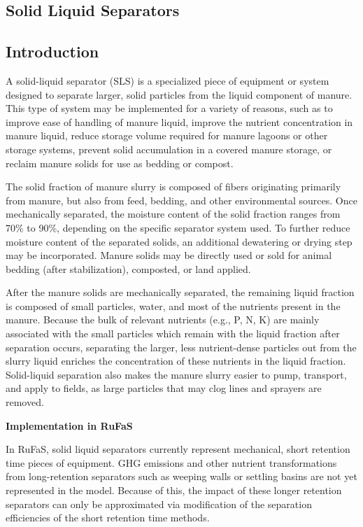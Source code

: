 \begin{refsection}
 


\section{Solid Liquid Separators} 
\subsection{Introduction} A solid-liquid separator (SLS) is a specialized piece of equipment or system designed to separate larger, solid particles from the liquid component of manure. This type of system may be implemented for a variety of reasons, such as to improve ease of handling of manure liquid, improve the nutrient concentration in manure liquid, reduce storage volume required for manure lagoons or other storage systems, prevent solid accumulation in a covered manure storage, or reclaim manure solids for use as bedding or compost. 
    
The solid fraction of manure slurry is composed of fibers originating primarily from manure, but also from feed, bedding, and other environmental sources. Once mechanically separated, the moisture content of the solid fraction ranges from 70\% to 90\%, depending on the specific separator system used. To further reduce moisture content of the separated solids, an additional dewatering or drying step may be incorporated. Manure solids may be directly used or sold for animal bedding (after stabilization), composted, or land applied. 
    
After the manure solids are mechanically separated, the remaining liquid fraction is composed of small particles, water, and most of the nutrients present in the manure. Because the bulk of relevant nutrients (e.g., P, N, K) are mainly associated with the small particles which remain with the liquid fraction after separation occurs, separating the larger, less nutrient-dense particles out from the slurry liquid enriches the concentration of these nutrients in the liquid fraction. Solid-liquid separation also makes the manure slurry easier to pump, transport, and apply to fields, as large particles that may clog lines and sprayers are removed.
\vspace{0.5cm}

\textbf{Implementation in RuFaS}
\vspace{ 0.25cm}
    
In RuFaS, solid liquid separators currently represent mechanical, short retention time pieces of equipment. GHG emissions and other nutrient transformations from long-retention separators such as weeping walls or settling basins are not yet represented in the model. Because of this, the impact of these longer retention separators can only be approximated via modification of the separation efficiencies of the short retention time methods.
\vspace{0.15cm}


\end{refsection}
